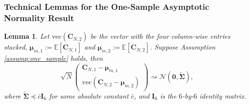 \documentclass[12pt,letterpaper]{article}
\newtheorem{lemma}{Lemma}[section]
\begin{document}
\subsubsection{Technical Lemmas for the One-Sample Asymptotic Normality Result}
\begin{lemma}\label{lemma:CLT:one-sample} Let $\mathrm{vec}(\mathbf{C}_{N,2})$ be the vector with the four column-wise entries stacked, $\boldsymbol{\mu}_{m,1}:=\mathbb{E}[\mathbf{C}_{N,1}]$ and $\boldsymbol{\mu}_{m,2}:=\mathbb{E}[\mathbf{C}_{N,2}]$. Suppose Assumption \ref{assump:one_sample} holds, then 
\begin{equation}\label{eq:CLT:main}
\sqrt{N}\begin{pmatrix}
\mathbf{C}_{N,1}-\boldsymbol{\mu}_{m,1}\\
\mathrm{vec}(\mathbf{C}_{N,2}-\boldsymbol{\mu}_{m,2})
\end{pmatrix}\rightsquigarrow\mathcal{N}\left(\mathbf{0},\widetilde{\boldsymbol{\Sigma}}\right),
\end{equation}
where $\widetilde{\boldsymbol{\Sigma}}\preceq\bar{c}\mathbf{I}_6$ for some absolute constant $\bar{c}$, and $\mathbf{I}_6$ is the $6$-by-$6$ identity matrix.
\end{lemma}
\end{document}
